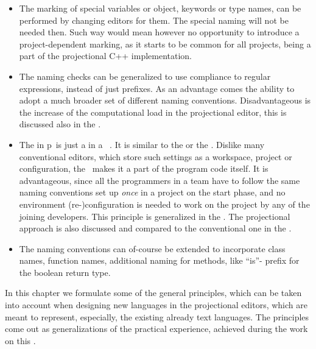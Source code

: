   \begin{itemize}
   \item  The marking of special variables or object, keywords or type names, can be performed by changing editors for them. The special
naming will not be needed then. Such way would mean however no opportunity to introduce a project-dependent marking, as it starts to be
common for all projects, being a part of the projectional C++ implementation.

\item The naming checks can be generalized to use compliance to regular expressions, instead of just prefixes. As an advantage comes the
ability to adopt a much broader set of different naming conventions. Disadvantageous is the increase
of the computational load in the projectional editor, this is discussed also in the .

\item The  in p\pcpp\ is just a  in a \jbmps\ . It is similar to the 
 or the  . 
Dislike many conventional editors, which store such settings as a workspace, project or  configuration, the
\pcpp\ makes it a part of the program code itself. It is advantageous, since all the programmers in a team have to follow the 
same naming conventions set up \emph{once} in a project on the start phase, and no environment (re-)configuration is needed to work on the project by
any of the joining developers. This principle is generalized in the . 
The projectional approach is also discussed and compared to the conventional one in the .

\item The naming conventions can of-course be extended to incorporate class names, function names, additional naming for methods,
like ``is''- prefix for the boolean return type. 


  \end{itemize}

 


In this chapter we formulate some of the general principles, which can be taken into
account when designing new languages in the projectional editors, which are meant to represent, especially,
the existing already text languages. The principles come out as generalizations of the practical experience,
achieved during the work on this \MT.

